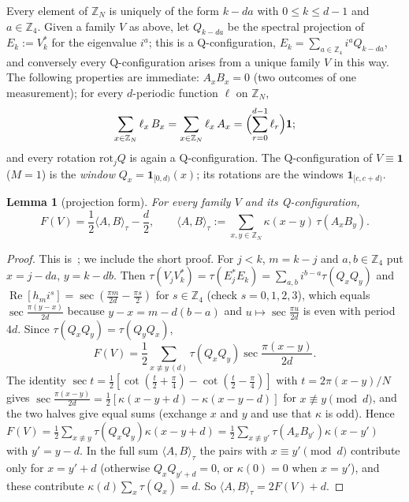 \documentclass[11pt]{amsart}
\newtheorem{lemma}[theorem]{Lemma}
\theoremstyle{definition}
\theoremstyle{remark}
\numberwithin{equation}{section}
\newcommand{\Z}{\mathbb{Z}}
\renewcommand{\Re}{\operatorname{Re}}
\newcommand{\one}{\mathbf{1}}
\newcommand{\ip}[2]{\langle #1,#2\rangle}
\begin{document}
Every element of $\Z_N$ is uniquely of the form $k-da$ with $0\le k\le d-1$ and $a\in\Z_4$. Given a family $V$ as
above, let $Q_{k-da}$ be the spectral projection of $E_k:=V_k^*$ for the eigenvalue $i^a$; this is a
Q-configuration, $E_k=\sum_{a\in\Z_4}i^aQ_{k-da}$, and conversely every Q-configuration arises from a unique family
$V$ in this way. The following properties are immediate: $A_xB_x=0$ (two outcomes of one measurement); for every
$d$-periodic function $\ell$ on $\Z_N$,
\begin{equation}\label{eq:opconstraint}
\sum_{x\in\Z_N}\ell_x\,B_x=\sum_{x\in\Z_N}\ell_x\,A_x=\Bigl(\sum_{r=0}^{d-1}\ell_r\Bigr)\one ;
\end{equation}
and every rotation $\mathrm{rot}_jQ$ is again a Q-configuration. The Q-configuration of $V\equiv\one$ ($M=1$) is the
\emph{window} $Q_x=\one_{[0,d)}(x)$; its rotations are the windows $\one_{[c,c+d)}$.

\begin{lemma}[projection form]\label{lem:projform}
For every family $V$ and its Q-configuration,
\[
F(V)=\frac12\ip AB_\tau-\frac d2,\qquad \ip AB_\tau:=\sum_{x,y\in\Z_N}\kappa(x-y)\,\tau(A_xB_y).
\]
\end{lemma}

\begin{proof}
This is~\cite[eq.~(13)]{MS-classical}; we include the short proof. For $j<k$, $m=k-j$ and $a,b\in\Z_4$ put
$x=j-da$, $y=k-db$. Then $\tau(V_jV_k^*)=\tau(E_j^*E_k)=\sum_{a,b}i^{b-a}\tau(Q_xQ_y)$ and
$\Re[h_mi^{s}]=\sec(\frac{\pi m}{2d}-\frac{\pi s}2)$ for $s\in\Z_4$ (check $s=0,1,2,3$), which equals
$\sec\frac{\pi(y-x)}{2d}$ because $y-x=m-d(b-a)$ and $u\mapsto\sec\frac{\pi u}{2d}$ is even with period $4d$. Since
$\tau(Q_xQ_y)=\tau(Q_yQ_x)$,
\[
F(V)=\frac12\sum_{x\not\equiv y\ (d)}\tau(Q_xQ_y)\sec\frac{\pi(x-y)}{2d}.
\]
The identity $\sec t=\frac12[\cot(\frac t2+\frac\pi4)-\cot(\frac t2-\frac\pi4)]$ with $t=2\pi(x-y)/N$ gives
$\sec\frac{\pi(x-y)}{2d}=\frac12[\kappa(x-y+d)-\kappa(x-y-d)]$ for $x\not\equiv y\pmod d$, and the two halves give equal
sums (exchange $x$ and $y$ and use that $\kappa$ is odd). Hence
$F(V)=\frac12\sum_{x\not\equiv y}\tau(Q_xQ_y)\kappa(x-y+d)=\frac12\sum_{x\not\equiv y'}\tau(A_xB_{y'})\kappa(x-y')$ with
$y'=y-d$. In the full sum $\ip AB_\tau$ the pairs with $x\equiv y'\pmod d$ contribute only for $x=y'+d$ (otherwise
$Q_xQ_{y'+d}=0$, or $\kappa(0)=0$ when $x=y'$), and these contribute $\kappa(d)\sum_x\tau(Q_x)=d$. So
$\ip AB_\tau=2F(V)+d$.
\end{proof}
\end{document}

